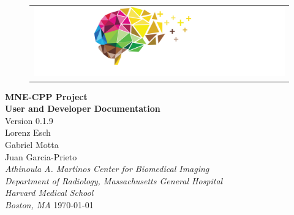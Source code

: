 \documentclass[12pt, twoside]{article}
\newcommand{\versionnumber}{0.1.9}
\begin{document}

\begin{titlepage}
\begin{figure}
\begin{tabular}{@{}l@{}}
\includegraphics[width=25cm]{mne-cpp_logo_notext.png}
\end{tabular}
\end{figure}


\begin{flushright}
\vspace{12pt}  
\vfill
\LARGE{\textbf{MNE-CPP Project}} \\

\Huge{\textbf{User and Developer Documentation}} \\
\large{Version \versionnumber} \\
\vfill
\large Lorenz Esch \\
\large Gabriel Motta \\
\large Juan Garcia-Prieto \\
\vspace{12pt}
\textit{Athinoula A. Martinos Center for Biomedical Imaging}\\
\textit{Department of Radiology, Massachusetts General Hospital}\\
\textit{Harvard Medical School}\\
\textit{Boston, MA}
\vspace{12pt}
\vfill
\today 


\end{flushright}
\end{titlepage}
\let\cleardoublepage\clearpage
\end{document}
